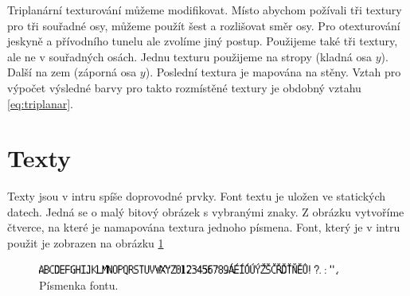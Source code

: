 Triplanární texturování můžeme modifikovat.
Místo abychom požívali tři textury pro tři souřadné osy, můžeme použít šest a rozlišovat směr osy.
Pro otexturování jeskyně a přívodního tunelu ale zvolíme jiný postup.
Použijeme také tři textury, ale ne v souřadných osách.
Jednu texturu použijeme na stropy (kladná osa $y$).
Další na zem (záporná osa $y$).
Poslední textura je mapována na stěny.
Vztah pro výpočet výsledné barvy pro takto rozmístěné textury je obdobný vztahu \ref{eq:triplanar}.















\section{Texty}
Texty jsou v intru spíše doprovodné prvky.
Font textu je uložen ve statických datech.
Jedná se o malý bitový obrázek s vybranými znaky.
Z obrázku vytvoříme čtverce, na které je namapována textura jednoho písmena.
Font, který je v intru použit je zobrazen na obrázku \ref{fig:font}

\begin{figure}[h]
\centering
\includegraphics[width=10cm,keepaspectratio]{obr/font.jpg}
\caption{Písmenka fontu.}
\label{fig:font}
\end{figure}


